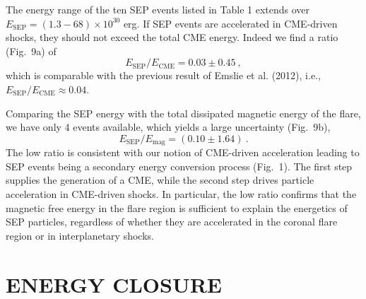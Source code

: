 \documentclass[10pt,preprint]{aastex}  %
\begin{document}
The energy range of the ten SEP events listed in Table 1 extends
over $E_{\mathrm{SEP}}=(1.3 - 68) \times 10^{30}$ erg. 
If SEP events are
accelerated in CME-driven shocks, they should not exceed the
total CME energy. Indeed we find a ratio (Fig.~9a) of
\begin{equation}
	E_{\mathrm{SEP}}/E_{\mathrm{CME}} = 0.03 \pm 0.45 \ ,
\end{equation} 
which is comparable with the previous result of Emslie et al. (2012),
i.e., $E_{\mathrm{SEP}}/E_{\mathrm{CME}} \approx 0.04$.

Comparing the SEP energy with the total dissipated magnetic energy
of the flare, we have only 4 events available,
which yields a large uncertainty (Fig.~9b), 
\begin{equation}
	E_{\mathrm{SEP}} / E_{\mathrm{mag}} = (0.10 \pm 1.64) \ .
\end{equation}
The low ratio is consistent with our notion of CME-driven acceleration
leading to SEP events being a secondary energy conversion process
(Fig.~1). The first step supplies the generation of a CME,
while the second step drives particle acceleration in CME-driven
shocks. In particular, the low ratio confirms that the magnetic 
free energy in the flare region is sufficient to explain the
energetics of SEP particles, regardless of whether they are accelerated
in the coronal flare region or in interplanetary shocks. 

\section{	ENERGY CLOSURE 					}
\end{document}
